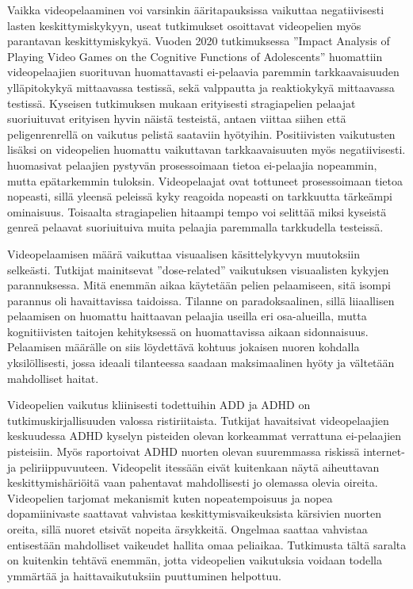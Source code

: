 \documentclass[utf8,bachelor]{gradu3}
\begin{document}
Vaikka videopelaaminen voi varsinkin ääritapauksissa vaikuttaa negatiivisesti lasten keskittymiskykyyn, useat tutkimukset osoittavat videopelien myös parantavan keskittymiskykyä. Vuoden 2020 tutkimuksessa ''Impact Analysis of Playing Video Games on the Cognitive Functions of Adolescents'' \parencite{choudhury2022cognitive} huomattiin videopelaajien suorituvan huomattavasti ei-pelaavia paremmin tarkkaavaisuuden ylläpitokykyä mittaavassa testissä, sekä valppautta ja reaktiokykyä mittaavassa testissä. Kyseisen tutkimuksen mukaan erityisesti stragiapelien pelaajat suoriuituvat erityisen hyvin näistä testeistä, antaen viittaa siihen että peligenrenrellä on vaikutus pelistä saataviin hyötyihin. Positiivisten vaikutusten lisäksi on videopelien huomattu vaikuttavan tarkkaavaisuuten myös negatiivisesti. \textcite{ozccetin2019relationships} huomasivat pelaajien pystyvän prosessoimaan tietoa ei-pelaajia nopeammin, mutta epätarkemmin tuloksin. Videopelaajat ovat tottuneet prosessoimaan tietoa nopeasti, sillä yleensä peleissä kyky reagoida nopeasti on tarkkuutta tärkeämpi ominaisuus. Toisaalta stragiapelien hitaampi tempo voi selittää miksi kyseistä genreä pelaavat suoriuituiva muita pelaajia paremmalla tarkkudella testeissä.  

Videopelaamisen määrä vaikuttaa visuaalisen käsittelykyvyn muutoksiin selkeästi. Tutkijat \textcite{zioga2024validation} mainitsevat ''dose-related'' vaikutuksen visuaalisten kykyjen parannuksessa. Mitä enemmän aikaa käytetään pelien pelaamiseen, sitä isompi parannus oli havaittavissa taidoissa. Tilanne on paradoksaalinen, sillä liiaallisen pelaamisen on huomattu haittaavan pelaajia useilla eri osa-alueilla, mutta kognitiivisten taitojen kehityksessä on huomattavissa aikaan sidonnaisuus. Pelaamisen määrälle on siis löydettävä kohtuus jokaisen nuoren kohdalla yksilöllisesti, jossa ideaali tilanteessa saadaan maksimaalinen hyöty ja vältetään mahdolliset haitat.  

Videopelien vaikutus kliinisesti todettuihin ADD ja ADHD on tutkimuskirjallisuuden valossa ristiriitaista. Tutkijat \textcite{jamanetworkopen} havaitsivat videopelaajien keskuudessa ADHD kyselyn pisteiden olevan korkeammat verrattuna ei-pelaajien pisteisiin.  Myös \textcite{lerida2022internet} raportoivat ADHD nuorten olevan suuremmassa riskissä internet- ja peliriippuvuuteen. Videopelit itessään eivät kuitenkaan näytä aiheuttavan keskittymishäriöitä vaan pahentavat mahdollisesti jo olemassa olevia oireita. Videopelien tarjomat mekanismit kuten nopeatempoisuus ja nopea dopamiinivaste saattavat vahvistaa keskittymisvaikeuksista kärsivien nuorten oreita, sillä nuoret etsivät nopeita ärsykkeitä. Ongelmaa saattaa vahvistaa entisestään mahdolliset vaikeudet hallita omaa peliaikaa. Tutkimusta tältä saralta on kuitenkin tehtävä enemmän, jotta videopelien vaikutuksia voidaan todella ymmärtää ja haittavaikutuksiin puuttuminen helpottuu. 
\end{document}
